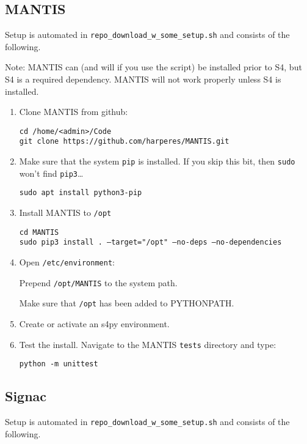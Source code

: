 \subsection{MANTIS} \label{subsec:installMANTIS}

Setup is automated in \texttt{repo\_download\_w\_some\_setup.sh} and consists of the following.

Note: MANTIS can (and will if you use the script) be installed prior to S4, but S4 is a required dependency. MANTIS will not work properly unless S4 is installed.

\begin{enumerate}
\item Clone MANTIS from github:

	\texttt{cd /home/<admin>/Code} \\
	\texttt{git clone https://github.com/harperes/MANTIS.git}

\item Make sure that the system \texttt{pip} is installed. If you skip this bit, then \texttt{sudo} won't find \texttt{pip3}\dots

	\texttt{sudo apt install python3-pip}

\item Install MANTIS to \texttt{/opt}

\texttt{cd MANTIS} \\
\texttt{sudo pip3 install . --target="/opt" --no-deps --no-dependencies}

\item Open \texttt{/etc/environment}:

	Prepend \texttt{/opt/MANTIS} to the system path.
	
	Make sure that \texttt{/opt} has been added to PYTHONPATH.

\item Create or activate an s4py environment. 

\item Test the install. Navigate to the MANTIS \texttt{tests} directory and type:
	
	\texttt{python -m unittest}

\end{enumerate}

\subsection{Signac} \label{subsec:installSignac}

Setup is automated in \texttt{repo\_download\_w\_some\_setup.sh} and consists of the following.

